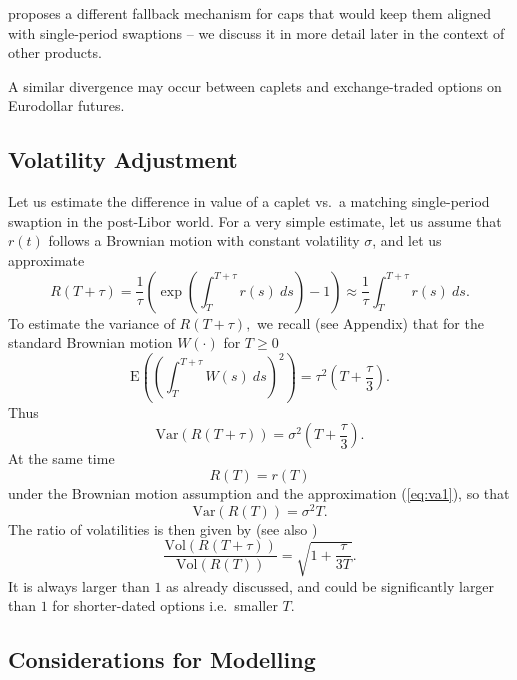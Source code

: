 \documentclass{article}
\begin{document}
\cite{henrard-blog1} proposes a different fallback mechanism for caps that
would keep them aligned with single-period swaptions -- we discuss it in
more detail later in the context of other products.

A similar divergence may occur between caplets and exchange-traded options
on Eurodollar futures.

\subsection{Volatility Adjustment}

Let us estimate the difference in value of a caplet vs.~a matching
single-period swaption in the post-Libor world. For a very simple estimate,
let us assume that $r(t)$ follows a Brownian motion with constant volatility 
$\sigma $, and let us approximate%
\begin{equation}
R(T+\tau )=\frac{1}{\tau }\left( \exp \left( \int_{T}^{T+\tau
}r(s)~ds\right) -1\right) \approx \frac{1}{\tau }\int_{T}^{T+\tau }r(s)~ds.
\label{eq:va1}
\end{equation}%
To estimate the variance of $R(T+\tau ),$ we recall (see Appendix) that for
the standard Brownian motion $W(\cdot )$ for $T\geq 0$%
\begin{equation*}
\mathrm{E}\left( \left( \int_{T}^{T+\tau }W(s)~ds\right) ^{2}\right) =\tau
^{2}\left( T+\frac{\tau }{3}\right) .
\end{equation*}%
Thus%
\begin{equation*}
\mathrm{Var}\left( R(T+\tau )\right) =\sigma ^{2}\left( T+\frac{\tau }{3}%
\right) .
\end{equation*}%
At the same time 
\begin{equation*}
R(T)=r(T)
\end{equation*}%
under the Brownian motion assumption and the approximation (\ref{eq:va1}),
so that%
\begin{equation*}
\mathrm{Var}\left( R(T)\right) =\sigma ^{2}T.
\end{equation*}%
The ratio of volatilities is then given by (see also \cite{lyas-merk-ssrn})%
\begin{equation}
\frac{\mathrm{Vol}\left( R(T+\tau )\right) }{\mathrm{Vol}\left( R(T)\right) }%
=\sqrt{1+\frac{\tau }{3T}}.  \label{eq:cpl9}
\end{equation}%
It is always larger than $1$ as already discussed, and could be
significantly larger than $1$ for shorter-dated options i.e.~smaller $T.$

\subsection{Considerations for Modelling}
\end{document}
